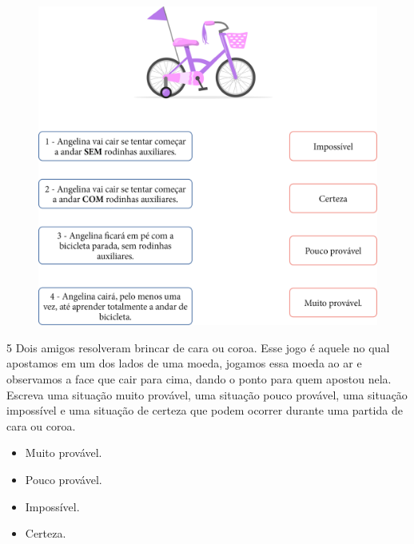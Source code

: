 \begin{figure}[htpb!]
\includegraphics[width=\textwidth]{./media/image87.png}
\end{figure}


\num{5} Dois amigos resolveram brincar de cara ou coroa. Esse jogo é aquele no
qual apostamos em um dos lados de uma moeda, jogamos essa moeda ao ar e observamos a face
que cair para cima, dando o ponto para quem apostou nela. Escreva uma
situação muito provável, uma situação pouco provável, uma situação
impossível e uma situação de certeza que podem ocorrer durante uma partida de cara ou coroa.

\pagebreak
\begin{itemize}
\item Muito provável.


\item Pouco provável.


\item Impossível.


\item Certeza.

\end{itemize}

